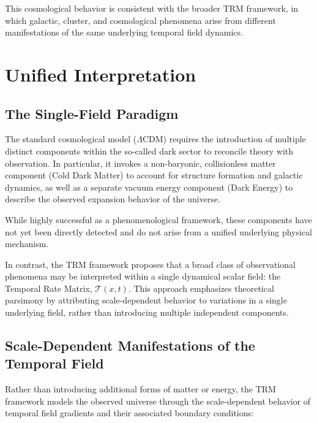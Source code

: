 \documentclass[11pt]{article}
\begin{document}
	This cosmological behavior is consistent with the broader TRM framework, in which galactic, cluster, and cosmological phenomena arise from different manifestations of the same underlying temporal field dynamics.


	\section{Unified Interpretation}

	\subsection{The Single-Field Paradigm}

	The standard cosmological model ($\Lambda$CDM) requires the introduction of multiple distinct components within the so-called dark sector to reconcile theory with observation. In particular, it invokes a non-baryonic, collisionless matter component (Cold Dark Matter) to account for structure formation and galactic dynamics, as well as a separate vacuum energy component (Dark Energy) to describe the observed expansion behavior of the universe.

	While highly successful as a phenomenological framework, these components have not yet been directly detected and do not arise from a unified underlying physical mechanism.

	In contrast, the TRM framework proposes that a broad class of observational phenomena may be interpreted within a single dynamical scalar field: the Temporal Rate Matrix, $\mathcal{T}(x,t)$. This approach emphasizes theoretical parsimony by attributing scale-dependent behavior to variations in a single underlying field, rather than introducing multiple independent components.

	\subsection{Scale-Dependent Manifestations of the Temporal Field}

	Rather than introducing additional forms of matter or energy, the TRM framework models the observed universe through the scale-dependent behavior of temporal field gradients and their associated boundary conditions:
\end{document}
